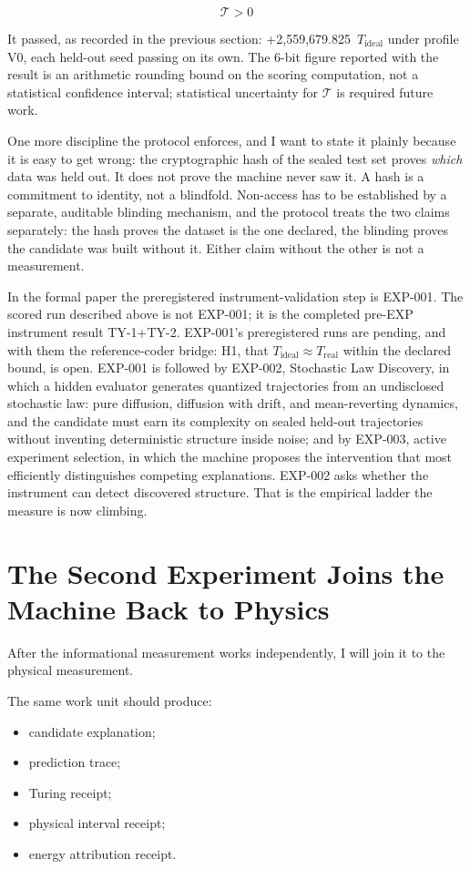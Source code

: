 \documentclass[11pt]{article}
\begin{document}
\[
\boxed{\mathcal{T}>0}
\]

It passed, as recorded in the previous section: +2,559,679.825~\(T_{\mathrm{ideal}}\) under profile V0, each held-out seed passing on its own. The 6-bit figure reported with the result is an arithmetic rounding bound on the scoring computation, not a statistical confidence interval; statistical uncertainty for \(\mathcal{T}\) is required future work.

One more discipline the protocol enforces, and I want to state it plainly because it is easy to get wrong: the cryptographic hash of the sealed test set proves \textit{which} data was held out. It does not prove the machine never saw it. A hash is a commitment to identity, not a blindfold. Non-access has to be established by a separate, auditable blinding mechanism, and the protocol treats the two claims separately: the hash proves the dataset is the one declared, the blinding proves the candidate was built without it. Either claim without the other is not a measurement.

In the formal paper the preregistered instrument-validation step is EXP-001. The scored run described above is not EXP-001; it is the completed pre-EXP instrument result TY-1+TY-2. EXP-001's preregistered runs are pending, and with them the reference-coder bridge: H1, that \(T_{\mathrm{ideal}} \approx T_{\mathrm{real}}\) within the declared bound, is open. EXP-001 is followed by EXP-002, Stochastic Law Discovery, in which a hidden evaluator generates quantized trajectories from an undisclosed stochastic law: pure diffusion, diffusion with drift, and mean-reverting dynamics, and the candidate must earn its complexity on sealed held-out trajectories without inventing deterministic structure inside noise; and by EXP-003, active experiment selection, in which the machine proposes the intervention that most efficiently distinguishes competing explanations. EXP-002 asks whether the instrument can detect discovered structure. That is the empirical ladder the measure is now climbing.

\section{The Second Experiment Joins the Machine Back to Physics}

After the informational measurement works independently, I will join it to the physical measurement.

The same work unit should produce:

\begin{itemize}
    \item candidate explanation;
    \item prediction trace;
    \item Turing receipt;
    \item physical interval receipt;
    \item energy attribution receipt.
\end{itemize}
\end{document}
